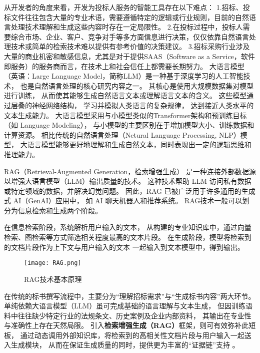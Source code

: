 \documentclass{xmu}
\begin{document}
从开发者的角度来看，开发为投标人服务的智能工具存在以下难点：
1.招标、投标文件往往包含大量的专业术语，需要遵循特定的逻辑或行业规则，目前的自然语言处理技术理解和生成这些内容时存在一定局限性。
2.在投标过程中，投标人需要综合市场、企业、客户、竞争对手等多方面信息进行决策，仅仅依靠自然语言处理技术或简单的检索技术难以提供有参考价值的决策建议。
3.招标采购行业涉及大量的商业机密和敏感信息，尤其是对于提供SAAS（Software as a Service，软件即服务）的服务商而言，在技术上和社会信任上都需要长期努力。
大语言模型（英语：Large Language Model，简称LLM）是一种基于深度学习的人工智能技术，
也是自然语言处理的核心研究内容之一。
其核心是使用大规模数据集对模型进行训练，
从而使其能够生成自然语言文本或理解语言文本的含义。
这些模型通过层叠的神经网络结构，
学习并模拟人类语言的复杂规律，
达到接近人类水平的文本生成能力。
大语言模型采用与小模型类似的Transformer架构和预训练目标（如 Language Modeling），
与小模型的主要区别在于增加模型大小、训练数据和计算资源。
相比传统的自然语言处理（Netural Language Processing, NLP）模型，
大语言模型能够更好地理解和生成自然文本，同时表现出一定的逻辑思维和推理能力。


RAG（Retrieval-Augmented Generation，检索增强生成）
是一种连接外部数据源以增强大语言模型（LLM）输出质量的技术。
这种技术帮助 LLM 访问私有数据或特定领域的数据，并解决幻觉问题。
因此，RAG 已被广泛用于许多通用的生成式 AI（GenAI）应用中，
如 AI 聊天机器人和推荐系统。
RAG技术一般可以划分为信息检索和生成两个阶段。

在信息检索阶段，系统解析用户输入的文本，
从构建的专业知识库中，通过向量检索、图检索等方式筛选相关程度最高的文本片段。
在生成阶段，模型将检索到的文档片段作为上下文与用户输入的文本
一起输入到文本模型中，得到输出。
\begin{figure}[!htb]
    \centering
    \texttt{[image: RAG.png]}\\
    \caption{RAG技术基本原理}\label{ragyuanli}
\end{figure}
在传统的标书撰写流程中，主要分为“理解招标需求”与“生成标书内容”两大环节。
单纯依赖大语言模型（LLM）虽可完成基础的语言理解与文本生成，
但因训练语料中往往缺少特定行业的法规条文、历史案例及企业内部资料，
其输出在专业性与准确性上存在天然局限。
引入{\bf 检索增强生成（RAG）}框架，则可有效弥补此短板，
通过动态调用外部知识库，将检索到的高相关性文档片段与用户输入一起送入生成模块，
从而在保证生成质量的同时，提供更为丰富的“证据链”支持 。
\end{document}
